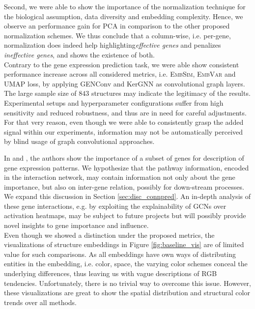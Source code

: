 \documentclass[]{article}
\begin{document}
Second, we were able to show the importance of the normalization technique for the biological assumption, data diversity and embedding complexity. Hence, we observe an performance gain for PCA in comparison to the other proposed normalization schemes. We thus conclude that a column-wise, i.e. per-gene, normalization does indeed help highlighting\textit{effective genes} and penalizes \textit{ineffective genes}, and shows the existence of both.\\

Contrary to the gene expression prediction task, we were able show consistent performance increase across all considered metrics, i.e. \textsc{EmbSim}, \textsc{EmbVar} and UMAP loss, by applying GENConv and KerGNN as convolutional graph layers. The large sample size of $843$ structures may indicate the legitimacy of the results. Experimental setups and hyperparameter configurations suffer from high sensitivity and reduced robustness, and thus are in need for careful adjustments. For that very reason, even though we were able to consistently grasp the added signal within our experiments, information may not be automatically perceived by blind usage of graph convolutional approaches.

In \citet{Partel2020} and \citet{bohland2010clustering}, the authors show the importance of a subset of genes for description of gene expression patterns. We hypothesize that the pathway information, encoded in the interaction network, may contain information not only about the gene importance, but also on inter-gene relation, possibly for down-stream processes. We expand this discussion in Section \ref{sec:disc_connpred}. An in-depth analysis of these gene interactions, e.g. by exploiting the explainability of GCNs over activation heatmaps, may be subject to future projects but will possibly provide novel insights to gene importance and influence. \\

Even though we showed a distinction under the proposed metrics, the visualizations of structure embeddings in Figure \ref{fig:baseline_vis} are of limited value for such comparisons. As all embeddings have own ways of distributing entities in the embedding, i.e. color, space, the varying color schemes conceal the underlying differences, thus leaving us with vague descriptions of RGB tendencies. Unfortunately, there is no trivial way to overcome this issue. However, these visualizations are great to show the spatial distribution and structural color trends over all methods.
 
\end{document}
